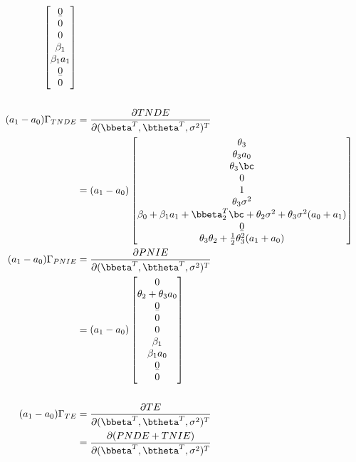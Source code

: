 \documentclass[dvipdfmx,10pt]{article}
\begin{document}
\begin{align*}
\begin{bmatrix}
      \b0\\
      0\\
      0\\
      \beta_{1}\\
      \beta_{1}a_{1}\\
      \b0\\
      0\\
    \end{bmatrix}\\
  \\
  (a_{1}-a_{0})\Gamma_{TNDE}
  &= \frac{\partial TNDE}{\partial (\bbeta^{T},\btheta^{T},\sigma^2)^{T}}\\
  &= (a_{1}-a_{0})
    \begin{bmatrix}
      \theta_{3}\\
      \theta_{3}a_{0}\\
      \theta_{3}\bc\\
      0\\
      1\\
      \theta_{3}\sigma^{2}\\
      \beta_{0} + \beta_{1}a_{1} + \bbeta_{2}^{T}\bc + \theta_{2}\sigma^{2} + \theta_{3}\sigma^{2}(a_{0} + a_{1})\\
      \b0\\
      \theta_{3}\theta_{2} + \frac{1}{2}\theta_{3}^{2}(a_{1} + a_{0})\\
    \end{bmatrix}\\
  (a_{1}-a_{0})\Gamma_{PNIE}
  &= \frac{\partial PNIE}{\partial (\bbeta^{T},\btheta^{T},\sigma^2)^{T}}\\
  &= (a_{1}-a_{0})
    \begin{bmatrix}
      0\\
      \theta_{2} + \theta_{3}a_{0}\\
      \b0\\
      0\\
      0\\
      \beta_{1}\\
      \beta_{1}a_{0}\\
      \b0\\
      0\\
    \end{bmatrix}\\
  \\
  (a_{1}-a_{0})\Gamma_{TE}
  &= \frac{\partial TE}{\partial (\bbeta^{T},\btheta^{T},\sigma^2)^{T}}\\
  &= \frac{\partial (PNDE+TNIE)}{\partial (\bbeta^{T},\btheta^{T},\sigma^2)^{T}}\\

\end{align*}
\end{document}
